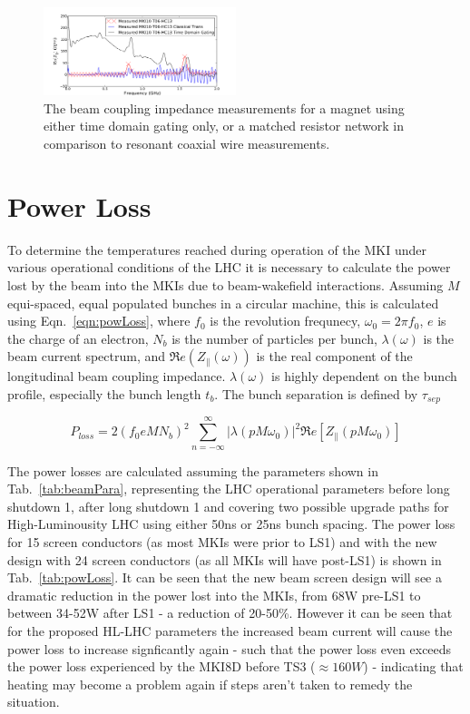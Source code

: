\documentclass[a4paper,
              ]{jacow}
\begin{document}
\begin{figure}
\includegraphics[width=0.5\textwidth]{compMeasurementGating.pdf}
\caption{The beam coupling impedance measurements for a magnet using either time domain gating only, or a matched resistor network in comparison to resonant coaxial wire measurements.}
\label{fig:measComp}
\end{figure}

\section{Power Loss}

To determine the temperatures reached during operation of the MKI under various operational conditions of the LHC it is necessary to calculate the power lost by the beam into the MKIs due to beam-wakefield interactions. Assuming $M$ equi-spaced, equal populated bunches in a circular machine, this is calculated using Eqn.~\ref{eqn:powLoss}, where $f_{0}$ is the revolution frequnecy, $\omega_{0}=2\pi f_{0}$, $e$ is the charge of an electron, $N_{b}$ is the number of particles per bunch, $\lambda(\omega)$ is the beam current spectrum, and $\Re{}e(Z_{\parallel}(\omega))$ is the real component of the longitudinal beam coupling impedance. $\lambda(\omega)$ is highly dependent on the bunch profile, especially the bunch length $t_{b}$. The bunch separation is defined by $\tau_{sep}$

\begin{equation}
P_{loss} = 2 \left( f_{0} e M  N_{b}\right)^{2} \displaystyle\sum\limits_{n = -\infty}^{\infty}  \left| \lambda \left( p M \omega_{0} \right)  \right|^{2} \Re{}e \left[ Z_{\parallel} \left( p M \omega_{0} \right) \right]
\label{eqn:powLoss}
\end{equation}

The power losses are calculated assuming the parameters shown in Tab.~\ref{tab:beamPara}, representing the LHC operational parameters before long shutdown 1, after long shutdown 1 and covering two possible upgrade paths for High-Luminousity LHC using either 50ns or 25ns bunch spacing. The power loss for 15 screen conductors (as most MKIs were prior to LS1) and with the new design with 24 screen conductors (as all MKIs will have post-LS1) is shown in Tab.~\ref{tab:powLoss}. It can be seen that the new beam screen design will see a dramatic reduction in the power lost into the MKIs, from 68W pre-LS1 to between 34-52W after LS1 - a reduction of 20-50\%. However it can be seen that for the proposed HL-LHC parameters the increased beam current will cause the power loss to increase signficantly again - such that the power loss even exceeds the power loss experienced by the MKI8D before TS3 ($\approx 160W$) - indicating that heating may become a problem again if steps aren't taken to remedy the situation.
\end{document}

